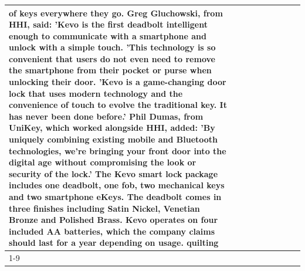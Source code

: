 \begin{table}[H]
\begin{tabular}{lllrlllll}
of keys everywhere they go. Greg Gluchowski, from HHI, said: 'Kevo is the first deadbolt intelligent enough to communicate with a smartphone and unlock with a simple touch. 'This technology is so convenient that users do not even need to remove the smartphone from their pocket or purse when unlocking their door. 'Kevo is a game-changing door lock that uses modern technology and the convenience of touch to evolve the traditional key. It has never been done before.' Phil Dumas, from UniKey, which worked alongside HHI, added: 'By uniquely combining existing mobile and Bluetooth technologies, we’re bringing your front door into the digital age without compromising the look or security of the lock.' The Kevo smart lock package includes one deadbolt, one fob, two mechanical keys and two smartphone eKeys. The deadbolt comes in three finishes including Satin Nickel, Venetian Bronze and Polished Brass. Kevo operates on four included AA batteries, which the company claims should last for a year depending on usage. quilting \\
\cline{1-9}

\end{tabular}
\end{table}
